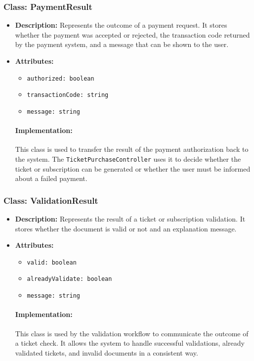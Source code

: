 \documentclass{article}
\begin{document}
\subsubsection*{Class: PaymentResult}
\begin{itemize}
    \item \textbf{Description:} Represents the outcome of a payment request. It stores whether the payment was accepted or rejected, the transaction code returned by the payment system, and a message that can be shown to the user.
    \item \textbf{Attributes:}
    \begin{itemize}
        \item \texttt{authorized: boolean}
        \item \texttt{transactionCode: string}
        \item \texttt{message: string}
    \end{itemize}
\paragraph{Implementation:} This class is used to transfer the result of the payment authorization back to the system. The \texttt{TicketPurchaseController} uses it to decide whether the ticket or subscription can be generated or whether the user must be informed about a failed payment.
\end{itemize}

\subsubsection*{Class: ValidationResult}
\begin{itemize}
    \item \textbf{Description:} Represents the result of a ticket or subscription validation. It stores whether the document is valid or not and an explanation message.
    \item \textbf{Attributes:}
    \begin{itemize}
        \item \texttt{valid: boolean}
        \item \texttt{alreadyValidate: boolean}
        \item \texttt{message: string}
    \end{itemize}
\paragraph{Implementation:} This class is used by the validation workflow to communicate the outcome of a ticket check. It allows the system to handle successful validations, already validated tickets, and invalid documents in a consistent way.
\end{itemize}
\end{document}
